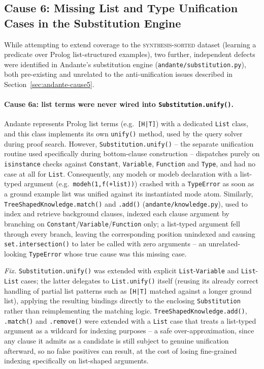 \subsection{Cause 6: Missing List and Type Unification Cases in the Substitution Engine}
\label{sec:andante-cause6}

While attempting to extend coverage to the \textsc{synthesis-sorted}
dataset (learning a predicate over Prolog list-structured examples), two
further, independent defects were identified in Andante's substitution
engine (\texttt{andante/substitution.py}), both pre-existing and
unrelated to the anti-unification issues described in
Section~\ref{sec:andante-cause5}.

\paragraph{Cause 6a: list terms were never wired into
\texttt{Substitution.unify()}.} Andante represents Prolog list terms
(e.g.\ \texttt{[H|T]}) with a dedicated \texttt{List} class, and this
class implements its own \texttt{unify()} method, used by the query
solver during proof search. However, \texttt{Substitution.unify()} --
the separate unification routine used specifically during bottom-clause
construction -- dispatches purely on \texttt{isinstance} checks against
\texttt{Constant}, \texttt{Variable}, \texttt{Function} and \texttt{Type},
and had no case at all for \texttt{List}. Consequently, any modeh or
modeb declaration with a list-typed argument (e.g.\
\texttt{modeh(1,f(+list))}) crashed with a \texttt{TypeError} as soon as
a ground example list was unified against its instantiated mode atom.
Similarly, \texttt{TreeShapedKnowledge.match()} and \texttt{.add()}
(\texttt{andante/knowledge.py}), used to index and retrieve background
clauses, indexed each clause argument by branching on
\texttt{Constant}/\texttt{Variable}/\texttt{Function} only; a list-typed
argument fell through every branch, leaving the corresponding position
unindexed and causing \texttt{set.intersection()} to later be called with
zero arguments -- an unrelated-looking \texttt{TypeError} whose true
cause was this missing case.

\emph{Fix.} \texttt{Substitution.unify()} was extended with explicit
\texttt{List}-\texttt{Variable} and \texttt{List}-\texttt{List} cases; the
latter delegates to \texttt{List.unify()} itself (reusing its already
correct handling of partial list patterns such as \texttt{[H|T]} matched
against a longer ground list), applying the resulting bindings directly
to the enclosing \texttt{Substitution} rather than reimplementing the
matching logic. \texttt{TreeShapedKnowledge.add()}, \texttt{.match()} and
\texttt{.remove()} were extended with a \texttt{List} case that treats a
list-typed argument as a wildcard for indexing purposes -- a safe
over-approximation, since any clause it admits as a candidate is still
subject to genuine unification afterward, so no false positives can
result, at the cost of losing fine-grained indexing specifically on
list-shaped arguments.

